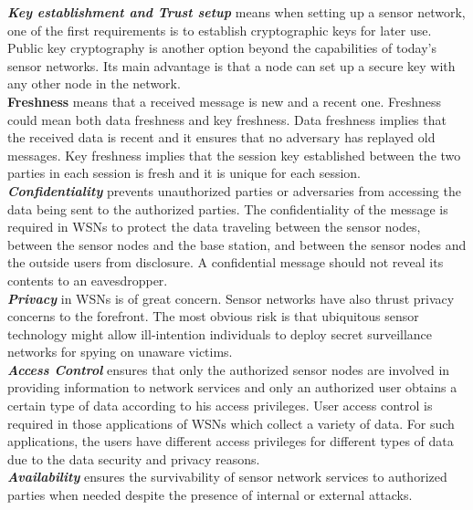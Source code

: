 \documentclass[a4paper,12pt]{report}
\begin{document}
\noindent \textbf{\textit{Key establishment and Trust setup}} means
when setting up a sensor network, one of the first requirements is
to establish cryptographic keys for later use. Public key
cryptography is another option beyond the capabilities of today's
sensor networks. Its main advantage is that a node can set up a
secure key with any other node in the network.\\

\noindent \textbf{Freshness} means that a received message is new
and a recent one. Freshness could mean both data freshness and key
freshness. Data freshness implies that the received data is recent
and it ensures that no adversary has replayed old messages. Key
freshness implies that the session key established between the two
parties in each session is fresh and it is unique for each
session.\\

\noindent \textit{\textbf{Confidentiality}} prevents unauthorized
parties or adversaries from accessing the data being sent to the
authorized parties. The confidentiality of the message is required
in WSNs to protect the data traveling between the sensor nodes,
between the sensor nodes and the base station, and between the
sensor nodes and the outside users from disclosure. A confidential
message should not reveal its contents to an eavesdropper.\\

\noindent \textbf{\textit{Privacy}} in WSNs is of great concern.
Sensor networks have also thrust privacy concerns to the forefront.
The most obvious risk is that ubiquitous sensor technology might
allow ill-intention individuals to deploy secret surveillance
networks for spying on unaware victims.\\

\noindent \textit{\textbf{Access Control}} ensures that only the
authorized sensor nodes are involved in providing information to
network services and only an authorized user obtains a certain type
of data according to his access privileges. User access control is
required in those applications of WSNs which collect a variety of
data. For such applications, the users have different access
privileges for different types of data due to the data security and
privacy reasons.\\

\noindent \textit{\textbf{Availability}} ensures the survivability
of sensor network services to authorized parties when needed despite
the presence of internal or external attacks.\\
\end{document}
